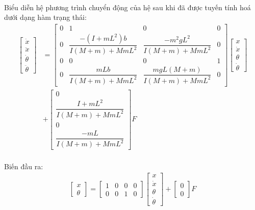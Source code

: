 \paragraph{}Biểu diễn hệ phương trình chuyển động của hệ sau khi đã được tuyến tính hoá dưới dạng hàm trạng thái: 
\begin{align}
\begin{bmatrix}
\dot{x}\\
\ddot{x}\\
\dot{\theta}\\
\ddot{\theta}
\end{bmatrix} 
&=
\begin{bmatrix}
0 & 1 & 0 & 0\\
0 & \dfrac{-(I + mL^{2})b}{I(M + m) + MmL^{2}} & \dfrac{-m^{2}gL^{2}}{I(M + m) + MmL^{2}} & 0\\
0 & 0 & 0 & 1 \\
0 & \dfrac{mLb}{I(M + m) + MmL^{2}} & \dfrac{mgL(M + m)}{I(M + m) + MmL^{2}} & 0
\end{bmatrix} 
\begin{bmatrix}
x\\
\dot{x}\\
\theta\\
\dot{\theta}
\end{bmatrix}\\
\nonumber
&+
\begin{bmatrix}
0\\
\dfrac{I + mL^{2}}{I(M + m) + MmL^{2}} \\
0\\
\dfrac{-mL}{I(M + m) + MmL^{2}}
\end{bmatrix}F
\end{align}
\paragraph{}Biến đầu ra:
\begin{align}
\begin{bmatrix}
x\\
\theta
\end{bmatrix}
=
\begin{bmatrix}
1 & 0 & 0 & 0\\
0 & 0 & 1 & 0 
\end{bmatrix}
\begin{bmatrix}
x\\
\dot{x}\\
\theta\\
\dot{\theta}
\end{bmatrix}
+
\begin{bmatrix}
0\\
0
\end{bmatrix}F
\end{align}
